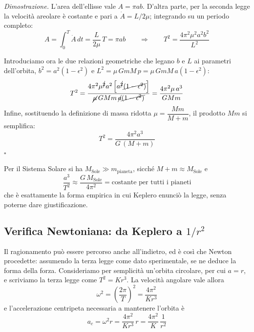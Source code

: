 \emph{Dimostrazione.} L'area dell'ellisse vale $A = \pi a b$. D'altra parte, per la seconda legge la velocità areolare è costante e pari a $\dot{A} = L/2\mu$; integrando su un periodo completo:
\begin{equation}
    A = \int_{0}^{T} \dot{A} \, dt = \frac{L}{2\mu}\,T = \pi a b
    \qquad \Longrightarrow \qquad
    T^2 = \frac{4\pi^2 \mu^2 a^2 b^2}{L^2}
\end{equation}

Introduciamo ora le due relazioni geometriche che legano $b$ e $L$ ai parametri dell'orbita, $b^2 = a^2(1-\epsilon^2)$ e $L^2 = \mu \, G m M \, p = \mu \, G m M \, a(1-\epsilon^2)$:
\begin{equation}
    T^2 = \frac{4\pi^2 \mu^{\cancel{2}} a^2 \left[a^{\cancel{2}}\cancel{(1-\epsilon^2)}\right]}
               {\cancel{\mu} \, G M m \, \cancel{a}\cancel{(1-\epsilon^2)}}
        = \frac{4\pi^2 \mu \, a^3}{G M m}
\end{equation}
Infine, sostituendo la definizione di massa ridotta $\mu = \dfrac{Mm}{M+m}$, il prodotto $Mm$ si semplifica:
\begin{equation}
    T^2 = \frac{4\pi^2 a^3}{G\,(M+m)}
\end{equation}
$\square$

Per il Sistema Solare si ha $M_{\text{Sole}} \gg m_{\text{pianeta}}$, sicché $M + m \approx M_{\text{Sole}}$ e
\begin{equation}
    \frac{a^3}{T^2} \approx \frac{G\,M_{\text{Sole}}}{4\pi^2} = \text{costante per tutti i pianeti}
\end{equation}
che è esattamente la forma empirica in cui Keplero enunciò la legge, senza poterne dare giustificazione.

\subsection{Verifica Newtoniana: da Keplero a \texorpdfstring{$1/r^2$}{1 su r quadro}}

Il ragionamento può essere percorso anche all'indietro, ed è così che Newton procedette: assumendo la terza legge come dato sperimentale, se ne deduce la forma della forza. Consideriamo per semplicità un'orbita circolare, per cui $a = r$, e scriviamo la terza legge come $T^2 = K r^3$. La velocità angolare vale allora
\begin{equation}
    \omega^2 = \left( \frac{2\pi}{T} \right)^{\!2} = \frac{4\pi^2}{K r^3}
\end{equation}
e l'accelerazione centripeta necessaria a mantenere l'orbita è
\begin{equation}
    a_c = \omega^2 r = \frac{4\pi^2}{K r^3} \, r = \frac{4\pi^2}{K} \, \frac{1}{r^2}
\end{equation}

